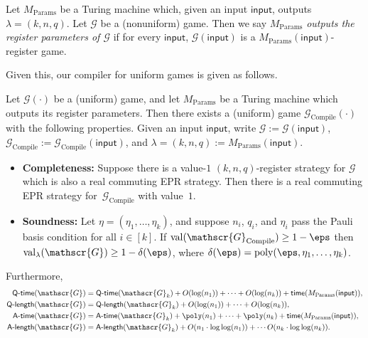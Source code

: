 \documentclass[11pt]{article}
\newcommand{\game}{\mathscr{G}}
\newcommand{\val}[1]{\mathrm{val}(#1)}
\newcommand{\valreg}[2]{\mathrm{val}_{#1}(#2)}
\newcommand{\qtime}[1]{\mathsf{Q}\textnormal{-}\mathsf{time}(#1)}
\newcommand{\atime}[1]{\mathsf{A}\textnormal{-}\mathsf{time}(#1)}
\newcommand{\qlength}[1]{\mathsf{Q}\textnormal{-}\mathsf{length}(#1)}
\newcommand{\alength}[1]{\mathsf{A}\textnormal{-}\mathsf{length}(#1)}
\begin{document}
\begin{definition}\label{def:reg-params-generator}
Let $M_{\mathrm{Params}}$ be a Turing machine which,
given an input $\mathsf{input}$, outputs $\lambda = (k, n, q)$.
Let $\game$ be a (nonuniform) game.
Then we say $M_{\mathrm{Params}}$ \emph{outputs the register parameters of $\game$}
if for every $\mathsf{input}$, $\game(\mathsf{input})$ is a $M_{\mathrm{Params}}(\mathsf{input})$-register game.
\end{definition}

Given this, our compiler for uniform games is given as follows.

\begin{corollary}\label{thm:uniform-registers}
Let $\game(\cdot)$ be a (uniform) game,
and let $M_{\mathrm{Params}}$ be a Turing machine which outputs its register parameters.
Then there exists a (uniform) game $\game_{\mathrm{Compile}}(\cdot)$ with the following properties.
Given an input $\mathsf{input}$, write $\game:=\game(\mathsf{input})$,
$\game_{\mathrm{Compile}} := \game_{\mathrm{Compile}}(\mathsf{input})$,
and $\lambda = (k, n, q) := M_{\mathrm{Params}}(\mathsf{input})$.
\begin{itemize}
\item[$\circ$] \textbf{Completeness:} Suppose there is a value-$1$ $(k,n,q)$-register strategy for $\game$ which is also a real commuting EPR strategy.
	Then there is a real commuting EPR strategy for~$\game_{\mathrm{Compile}}$ with value~$1$.
\item[$\circ$] \textbf{Soundness:}
Let $\eta = (\eta_1, \ldots, \eta_k)$, and suppose $n_i$, $q_i$, and $\eta_i$ pass the Pauli basis condition for all $i \in [k]$.
If $\val{\game_{\mathrm{Compile}}}\geq 1-\eps$ then $\valreg{\lambda}{\game} \geq 1 -\delta(\eps)$, where $\delta(\eps) = \mathrm{poly}(\eps, \eta_1, \ldots, \eta_k)$.
\end{itemize}
Furthermore,
\begin{align*}
\qtime{\game} &= \qtime{\game_k} + O(\log(n_1))+ \cdots + O(\log(n_k)) + \mathsf{time}(M_{\mathrm{Params}}(\mathsf{input})), \\
\qlength{\game} &= \qlength{\game_k} + O(\log(n_1)) + \cdots + O(\log(n_k)),  \\
\atime{\game} &= \atime{\game_k} + \poly(n_1) + \cdots + \poly(n_k)+ \mathsf{time}(M_{\mathrm{Params}}(\mathsf{input})),\\
\alength{\game} &= \alength{\game_k} + O(n_1 \cdot \log \log(n_1)) + \cdots O(n_k \cdot \log \log(n_k)).
\end{align*}
\end{corollary}
\end{document}
